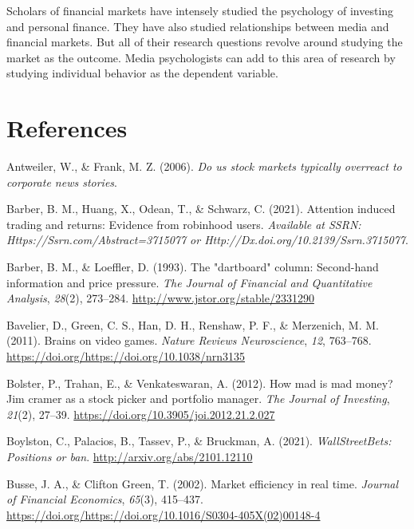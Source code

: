 \documentclass[12pt,]{article}
\begin{document}
Scholars of financial markets have intensely studied the psychology of
investing and personal finance. They have also studied relationships
between media and financial markets. But all of their research questions
revolve around studying the market as the outcome. Media psychologists
can add to this area of research by studying individual behavior as the
dependent variable.

\hypertarget{references}{%
\section*{References}\label{references}}

\hypertarget{refs}{}
\leavevmode\hypertarget{ref-antweiler2006}{}%
Antweiler, W., \& Frank, M. Z. (2006). \emph{Do us stock markets
typically overreact to corporate news stories}.

\leavevmode\hypertarget{ref-barber2021}{}%
Barber, B. M., Huang, X., Odean, T., \& Schwarz, C. (2021). Attention
induced trading and returns: Evidence from robinhood users.
\emph{Available at SSRN: Https://Ssrn.com/Abstract=3715077 or
Http://Dx.doi.org/10.2139/Ssrn.3715077}.

\leavevmode\hypertarget{ref-barber1993}{}%
Barber, B. M., \& Loeffler, D. (1993). The "dartboard" column:
Second-hand information and price pressure. \emph{The Journal of
Financial and Quantitative Analysis}, \emph{28}(2), 273--284.
\url{http://www.jstor.org/stable/2331290}

\leavevmode\hypertarget{ref-bavelier2011}{}%
Bavelier, D., Green, C. S., Han, D. H., Renshaw, P. F., \& Merzenich, M.
M. (2011). Brains on video games. \emph{Nature Reviews Neuroscience},
\emph{12}, 763--768.
\url{https://doi.org/https://doi.org/10.1038/nrn3135}

\leavevmode\hypertarget{ref-bolster2012}{}%
Bolster, P., Trahan, E., \& Venkateswaran, A. (2012). How mad is mad
money? Jim cramer as a stock picker and portfolio manager. \emph{The
Journal of Investing}, \emph{21}(2), 27--39.
\url{https://doi.org/10.3905/joi.2012.21.2.027}

\leavevmode\hypertarget{ref-boylston2021}{}%
Boylston, C., Palacios, B., Tassev, P., \& Bruckman, A. (2021).
\emph{WallStreetBets: Positions or ban}.
\url{http://arxiv.org/abs/2101.12110}

\leavevmode\hypertarget{ref-busse2002}{}%
Busse, J. A., \& Clifton Green, T. (2002). Market efficiency in real
time. \emph{Journal of Financial Economics}, \emph{65}(3), 415--437.
\url{https://doi.org/https://doi.org/10.1016/S0304-405X(02)00148-4}
\end{document}
